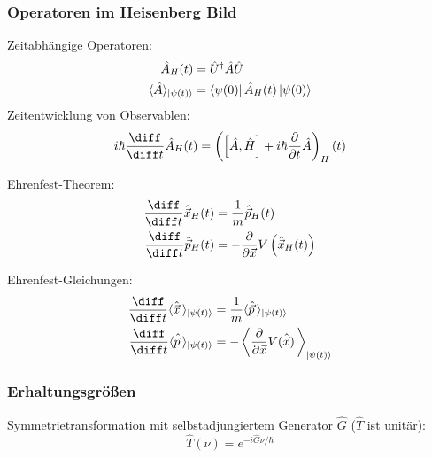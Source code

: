 \documentclass[11pt]{article}
\numberwithin{equation}{section}
\begin{document}
      \subsubsection{Operatoren im Heisenberg Bild}
        Zeitabhängige Operatoren:
        \begin{equation}
          \begin{aligned}
            \hat{A}_H(t) &= \hat{U}^\dagger \hat{A} \hat{U} \\
            \langle \hat{A} \rangle_{\Ket{\psi(t)}} &= \Bra{\psi(0)}\hat{A}_H(t)\Ket{\psi(0)}
          \end{aligned}
        \end{equation}
        Zeitentwicklung von Observablen:
        \begin{equation}
          i\hbar \tder{}{t} \hat{A}_H(t) = \left(\left[\hat{A}, \hat{H}\right] + i\hbar \pder{}{t} \hat{A}\right)_H (t)
        \end{equation}

        Ehrenfest-Theorem:
        \begin{equation}
          \begin{aligned}
            \tder{}{t} \hat{\vec{x}}_H(t) &= \frac{1}{m}\hat{\vec{p}}_H(t) \\
            \tder{}{t} \hat{\vec{p}}_H(t) &= - \pder{}{\vec{x}} V \left(\hat{\vec{x}}_H(t)\right) \\
          \end{aligned}
        \end{equation}

        Ehrenfest-Gleichungen:
        \begin{equation}
          \begin{aligned}
            \tder{}{t} \langle \hat{\vec{x}} \,\rangle_{\Ket{\psi(t)}} &= \frac{1}{m} \langle \hat{\vec{p}} \,\rangle_{\Ket{\psi(t)}} \\
            \tder{}{t} \langle \hat{\vec{p}} \,\rangle_{\Ket{\psi(t)}} &= - \left\langle \pder{}{\vec{x}} V(\hat{\vec{x}}) \,\right\rangle_{\Ket{\psi(t)}} \\
          \end{aligned}
        \end{equation}

      \subsubsection{Erhaltungsgrößen}
        Symmetrietransformation mit selbstadjungiertem Generator $\hat{G}$ ($\hat{T}$ ist unitär):
        \begin{equation}
          \hat{T}(\nu) = e^{-i\hat{G}\nu/\hbar}
        \end{equation}
\end{document}
